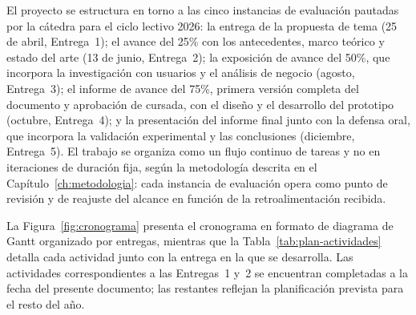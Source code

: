 
El proyecto se estructura en torno a las cinco instancias de evaluación pautadas por la cátedra para el ciclo lectivo 2026: la entrega de la propuesta de tema (25 de abril, Entrega~1); el avance del 25\% con los antecedentes, marco teórico y estado del arte (13 de junio, Entrega~2); la exposición de avance del 50\%, que incorpora la investigación con usuarios y el análisis de negocio (agosto, Entrega~3); el informe de avance del 75\%, primera versión completa del documento y aprobación de cursada, con el diseño y el desarrollo del prototipo (octubre, Entrega~4); y la presentación del informe final junto con la defensa oral, que incorpora la validación experimental y las conclusiones (diciembre, Entrega~5). El trabajo se organiza como un flujo continuo de tareas y no en iteraciones de duración fija, según la metodología descrita en el Capítulo~\ref{ch:metodologia}: cada instancia de evaluación opera como punto de revisión y de reajuste del alcance en función de la retroalimentación recibida.

La Figura~\ref{fig:cronograma} presenta el cronograma en formato de diagrama de Gantt organizado por entregas, mientras que la Tabla~\ref{tab:plan-actividades} detalla cada actividad junto con la entrega en la que se desarrolla. Las actividades correspondientes a las Entregas~1 y~2 se encuentran completadas a la fecha del presente documento; las restantes reflejan la planificación prevista para el resto del año.

